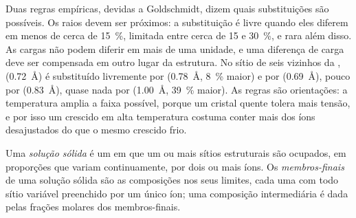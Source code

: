 Duas regras empíricas, devidas a Goldschmidt, dizem quais substituições são possíveis. Os raios devem ser próximos: a substituição é livre quando eles diferem em menos de cerca de \qty{15}{\percent}, limitada entre cerca de 15 e \qty{30}{\percent}, e rara além disso. As cargas não podem diferir em mais de uma unidade, e uma diferença de carga deve ser compensada em outro lugar da estrutura. No sítio de seis vizinhos da ,  (\qty{0.72}{\angstrom}) é substituído livremente por  (\qty{0.78}{\angstrom}, \qty{8}{\percent} maior) e por  (\qty{0.69}{\angstrom}), pouco por  (\qty{0.83}{\angstrom}), quase nada por  (\qty{1.00}{\angstrom}, \qty{39}{\percent} maior).
As regras são orientações: a temperatura amplia a faixa possível, porque um cristal quente tolera mais tensão, e por isso um  crescido em alta temperatura costuma conter mais dos íons desajustados do que o mesmo  crescido frio.

\begin{definition}\label{def:b1:rock-forming-minerals:solid-solution}
Uma \emph{solução sólida} é um  em que um ou mais sítios estruturais são ocupados, em proporções que variam continuamente, por dois ou mais íons. Os \emph{membros-finais} de uma solução sólida são as composições nos seus limites, cada uma com todo sítio variável preenchido por um único íon; uma composição intermediária é dada pelas frações molares dos membros-finais.
\end{definition}

